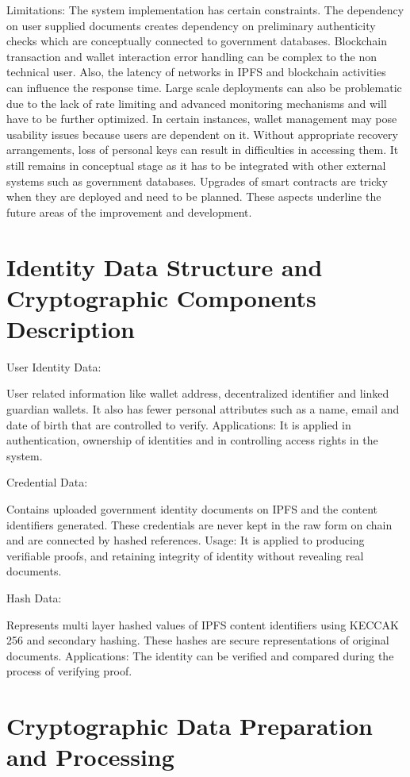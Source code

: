 Limitations:
The system implementation has certain constraints. The dependency on user supplied documents creates dependency on preliminary authenticity checks which are conceptually connected to government databases. Blockchain transaction and wallet interaction error handling can be complex to the non technical user. Also, the latency of networks in IPFS and blockchain activities can influence the response time. Large scale deployments can also be problematic due to the lack of rate limiting and advanced monitoring mechanisms and will have to be further optimized. In certain instances, wallet management may pose usability issues because users are dependent on it. Without appropriate recovery arrangements, loss of personal keys can result in difficulties in accessing them. It still remains in conceptual stage as it has to be integrated with other external systems such as government databases. Upgrades of smart contracts are tricky when they are deployed and need to be planned. These aspects underline the future areas of the improvement and development.

\section{Identity Data Structure and Cryptographic Components Description}
User Identity Data:

User related information like wallet address, decentralized identifier and linked guardian wallets. It also has fewer personal attributes such as a name, email and date of birth that are controlled to verify.
Applications: It is applied in authentication, ownership of identities and in controlling access rights in the system.

Credential Data:

Contains uploaded government identity documents on IPFS and the content identifiers generated. These credentials are never kept in the raw form on chain and are connected by hashed references.
Usage: It is applied to producing verifiable proofs, and retaining integrity of identity without revealing real documents.

Hash Data:

Represents multi layer hashed values of IPFS content identifiers using KECCAK 256 and secondary hashing. These hashes are secure representations of original documents.
Applications: The identity can be verified and compared during the process of verifying proof.



\section{Cryptographic Data Preparation and Processing}


